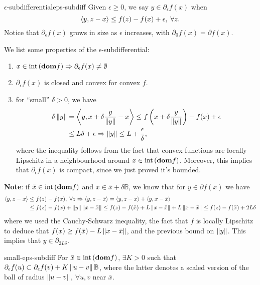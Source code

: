 \begin{cdefinition}{$\epsilon$-subdifferential}{eps-subdiff}
	Given $\epsilon \geq 0$, we say $y \in \partial_{\epsilon} f(x)$ when
	\[
		\left\langle y, z - x \right\rangle \leq f(z) - f(x) + \epsilon, \; \forall z.
	\]
	Notice that $\partial_{\epsilon} f(x)$ grows in size as $\epsilon$
	increases, with $\partial_0 f(x) = \partial f(x)$.
\end{cdefinition}

We list some properties of the $\epsilon$-subdifferential:
\begin{enumerate}[label=(\alph*)]
	\item $x \in \mathrm{int}\left( \textbf{dom} f \right) \Rightarrow \partial_{\epsilon} f(x) \neq
		\emptyset$
	\item $\partial_{\epsilon} f(x)$ is closed and convex for convex $f$.
	\item for ``small'' $\delta > 0$, we have
		\begin{align*}
			\delta \left \| y \right \| &= \left\langle y, x + \delta \frac{y}{\left \| y \right \|} - x \right\rangle
			\leq f\left(x + \delta \frac{y}{\left \| y \right \|}\right) - f(x) + \epsilon
			\\
			&\leq L \delta + \epsilon \Rightarrow \left \| y \right \| \leq L +
			\frac{\epsilon}{\delta},
		\end{align*}
		where the inequality follows from the fact that convex functions are
		locally Lipschitz in a neighbourhood around $x \in \mathrm{int}\left( \textbf{dom} f \right)$.
		Moreover, this implies that $\partial_{\epsilon} f(x)$ is compact,
		since we just proved it's bounded.
\end{enumerate}

\textbf{Note}: if $\bar{x} \in \mathrm{int}\left( \textbf{dom} f \right)$ and $x \in \bar{x} + \delta
\mathbb{B}$, we know that for $y \in \partial f(x)$ we have
\begin{align*}
	\left\langle y, z - x \right\rangle &\leq f(z) - f(x), \; \forall z \Rightarrow
	\left\langle y, z - \bar{x} \right\rangle = \left\langle y, z - x \right\rangle + \left\langle y, x - \bar{x} \right\rangle \\
	&\leq f(z) - f(x) + \left \| y \right \| \left \| x - \bar{x} \right \| \leq f(z) - f(\bar{x}) +
	L\left \| x - \bar{x} \right \| + L \left \| x - \bar{x} \right \| \leq f(z) - f(\bar{x}) + 2 L \delta
\end{align*}
where we used the Cauchy-Schwarz inequality, the fact that $f$ is locally
Lipschitz to deduce that $f(x) \geq f(\bar{x}) - L \left \| x - \bar{x} \right \|$, and the
previous bound on $\left \| y \right \|$. This implies that $y \in \partial_{2 L \delta}$.

\begin{exercise}{}{small-eps-subdiff}
	For $\bar{x} \in \mathrm{int}\left( \textbf{dom} f \right)$, $\exists K > 0$ such that
	$\partial_{\epsilon} f(u) \subset \partial_{\epsilon} f(v) + K \left \| u - v \right \|
	\mathbb{B}$, where the latter denotes a scaled version of the ball of
	radius $\left \| u - v \right \|$, $\forall u, v$ near $\bar{x}$.
\end{exercise}

